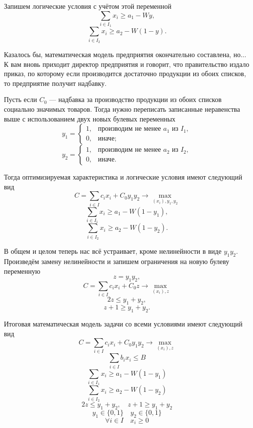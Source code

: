 Запишем логические условия с учётом этой переменной
\[
	\sum_{i \in I_1} x_i \ge a_1 - Wy,
\]
\[
	\sum_{i \in I_2} x_i \ge a_2 - W(1 - y).
\]

Казалось бы, математическая модель предприятия окончательно составлена, но... К вам вновь приходит директор предприятия и говорит, что правительство издало приказ, по которому если производится достаточно продукции из обоих списков, то предприятие получит надбавку.

Пусть если $C_0$ --- надбавка за производство продукции из обоих списков социально значимых товаров. Тогда нужно переписать записанные неравенства выше с использованием двух новых булевых переменных
\[
	y_1 = \begin{cases}
		1, & \text{производим не менее $a_1$ из $I_1$}, \\
		0, & \text{иначе};
	\end{cases}
\]
\[
	y_2 = \begin{cases}
		1, & \text{производим не менее $a_2$ из $I_2$}, \\
		0, & \text{иначе}.
	\end{cases}
\]

Тогда оптимизируемая характеристика и логические условия имеют следующий вид
\[
	C = \sum_{i \in I}c_i x_i + C_0 y_1 y_2 \to \max_{(x_i), y_1, y_2}
\]
\[
	\sum_{i \in I_1} x_i \ge a_1 - W(1 - y_1),
\]
\[
	\sum_{i \in I_2} x_i \ge a_2 - W(1 - y_2).
\]

В общем и целом теперь нас всё устраивает, кроме нелинейности в виде $y_1 y_2$. Произведём замену нелинейности и запишем ограничения на новую булеву переменную
\[
	z = y_1 y_2,
\]
\[
	C = \sum_{i \in I}c_i x_i + C_0 z \to \max_{(x_i), z}
\]
\[
	2z \le y_1 + y_2,
\]
\[
	z + 1 \ge y_1 + y_2.
\]

Итоговая математическая модель задачи со всеми условиями имеют следующий вид
\[
	C = \sum_{i \in I}c_i x_i + C_0 y_1 y_2 \to \max_{(x_i), z}
\]
\[
	\sum_{i \in I}b_i x_i \le B
\]
\[
	\sum_{i \in I_1} x_i \ge a_1 - W(1 - y_1)
\]
\[
	\sum_{i \in I_2} x_i \ge a_2 - W(1 - y_2)
\]
\[
	2z \le y_1 + y_2, \quad z + 1 \ge y_1 + y_2
\]
\[
	y_1 \in \{0, 1\} \quad y_2 \in \{0, 1\}
\]
\[
	\forall i \in I \quad x_i \ge 0
\]
